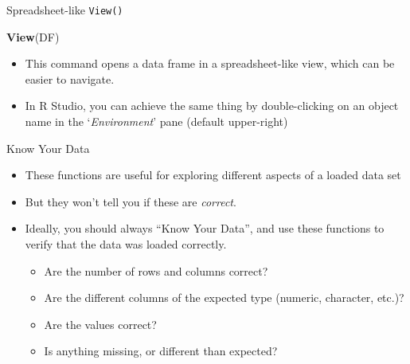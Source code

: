 \documentclass[
  11pt,
  ignorenonframetext,
]{beamer}
\newcommand{\VERB}{\Verb[commandchars=\\\{\}]}
\newenvironment{Shaded}{\begin{snugshade}}{\end{snugshade}}
\newcommand{\FunctionTok}[1]{\textcolor[rgb]{0.13,0.29,0.53}{\textbf{#1}}}
\newcommand{\NormalTok}[1]{#1}
\providecommand{\tightlist}{%
  \setlength{\itemsep}{0pt}\setlength{\parskip}{0pt}}
\begin{document}
\begin{frame}[fragile]{Spreadsheet-like \texttt{View()}}
\protect\hypertarget{spreadsheet-like-view}{}
\begin{Shaded}
\begin{Highlighting}[]
\FunctionTok{View}\NormalTok{(DF)}
\end{Highlighting}
\end{Shaded}

\begin{itemize}
\tightlist
\item
  This command opens a data frame in a spreadsheet-like view, which can
  be easier to navigate.
\end{itemize}

\begin{itemize}
\tightlist
\item
  In R Studio, you can achieve the same thing by double-clicking on an
  object name in the `\emph{Environment}' pane (default upper-right)

\end{itemize}
\end{frame}

\begin{frame}{Know Your Data}
\protect\hypertarget{know-your-data}{}
\begin{itemize}
\item
  These functions are useful for exploring different aspects of a loaded
  data set
\item
  But they won't tell you if these are \emph{correct}.
\item
  Ideally, you should always ``Know Your Data'', and use these functions
  to verify that the data was loaded correctly.

  \begin{itemize}
  \tightlist
  \item
    Are the number of rows and columns correct?
  \item
    Are the different columns of the expected type (numeric, character,
    etc.)?
  \item
    Are the values correct?
  \item
    Is anything missing, or different than expected?
  \end{itemize}
\end{itemize}
\end{frame}
\end{document}
